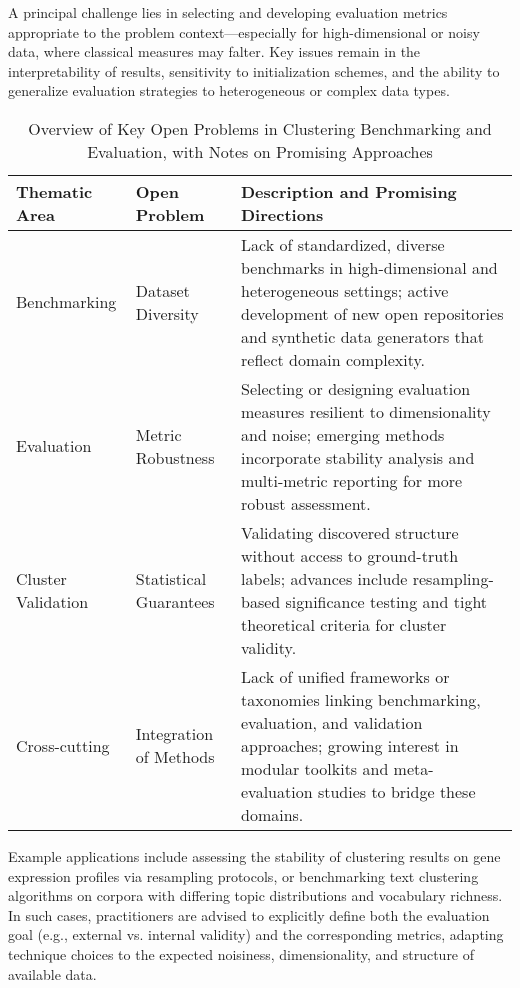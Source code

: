 \documentclass[sigconf]{acmart}
\begin{document}
A principal challenge lies in selecting and developing evaluation metrics appropriate to the problem context---especially for high-dimensional or noisy data, where classical measures may falter. Key issues remain in the interpretability of results, sensitivity to initialization schemes, and the ability to generalize evaluation strategies to heterogeneous or complex data types.

\begin{table*}[htbp]
\centering
\caption{Overview of Key Open Problems in Clustering Benchmarking and Evaluation, with Notes on Promising Approaches}
\label{tab:open_problems_benchmarking}
\begin{adjustbox}{max width=\textwidth}
\begin{tabular}{@{}lll@{}}
\toprule
Thematic Area & Open Problem & Description and Promising Directions \\
\midrule
Benchmarking & Dataset Diversity & Lack of standardized, diverse benchmarks in high-dimensional and heterogeneous settings; active development of new open repositories and synthetic data generators that reflect domain complexity. \\
Evaluation & Metric Robustness & Selecting or designing evaluation measures resilient to dimensionality and noise; emerging methods incorporate stability analysis and multi-metric reporting for more robust assessment. \\
Cluster Validation & Statistical Guarantees & Validating discovered structure without access to ground-truth labels; advances include resampling-based significance testing and tight theoretical criteria for cluster validity. \\
Cross-cutting & Integration of Methods & Lack of unified frameworks or taxonomies linking benchmarking, evaluation, and validation approaches; growing interest in modular toolkits and meta-evaluation studies to bridge these domains. \\
\bottomrule
\end{tabular}
\end{adjustbox}
\end{table*}

Example applications include assessing the stability of clustering results on gene expression profiles via resampling protocols, or benchmarking text clustering algorithms on corpora with differing topic distributions and vocabulary richness. In such cases, practitioners are advised to explicitly define both the evaluation goal (e.g., external vs. internal validity) and the corresponding metrics, adapting technique choices to the expected noisiness, dimensionality, and structure of available data.
\end{document}
